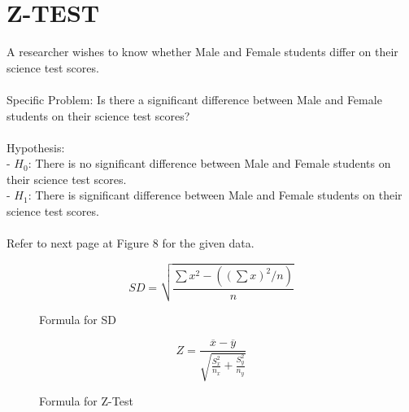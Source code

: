 \documentclass{article}
\begin{document}
    \section*{Z-TEST}
    \noindent
    A researcher wishes to know whether Male and Female students differ on their science test scores.\\\\
    Specific Problem: Is there a significant difference between Male and Female students on their science test scores?\\\\
    Hypothesis:\\
    -\hspace{1cm} $H_0$: There is no significant difference between Male and Female students on their science test scores.\\
    -\hspace{1cm} $H_1$: There is significant difference between Male and Female students on their science test scores.\\\\
    Refer to next page at Figure 8 for the given data.
    \begin{figure*}[ht!]
        \begin{equation}
            SD=\sqrt{\frac{\sum x^2-((\sum x)^2/n)}{n}}
        \end{equation}
        \caption{Formula for SD}
    \end{figure*}
    \begin{figure*}[ht!]
        \begin{equation}
            Z=\frac{\overline{x}-\overline{y}}{\sqrt{\frac{S_x^2}{n_x}+\frac{S_y^2}{n_y}}}
        \end{equation}
        \caption{Formula for Z-Test}
    \end{figure*}
    \newpage
\end{document}

